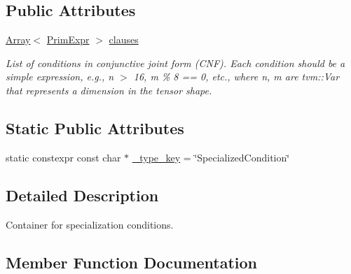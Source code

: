 \subsection*{Public Attributes}
\begin{DoxyCompactItemize}
\item 
\hyperlink{classtvm_1_1Array}{Array}$<$ \hyperlink{classtvm_1_1PrimExpr}{Prim\+Expr} $>$ \hyperlink{classtvm_1_1te_1_1SpecializedConditionNode_a8121936069bdc150f53c6c116100b8ad}{clauses}
\begin{DoxyCompactList}\small\item\em List of conditions in conjunctive joint form (C\+NF). Each condition should be a simple expression, e.\+g., n $>$ 16, m \% 8 == 0, etc., where n, m are tvm\+::\+Var that represents a dimension in the tensor shape. \end{DoxyCompactList}\end{DoxyCompactItemize}
\subsection*{Static Public Attributes}
\begin{DoxyCompactItemize}
\item 
static constexpr const char $\ast$ \hyperlink{classtvm_1_1te_1_1SpecializedConditionNode_a1772ec154d41ff8c2f4bfb692eee327d}{\+\_\+type\+\_\+key} = \char`\"{}Specialized\+Condition\char`\"{}
\end{DoxyCompactItemize}


\subsection{Detailed Description}
Container for specialization conditions. 

\subsection{Member Function Documentation}
